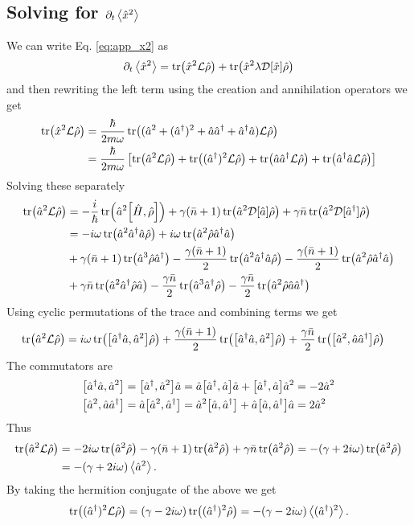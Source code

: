 \subsection{Solving for $\partial_t\expval{\hat{x}^2}$}
We can write Eq. \eqref{eq:app_x2} as 
\begin{equation}
    \partial_t\expval{\hat{x}^2} = \tr(\hat{x}^2 \mathcal{L}\hat{\rho}) + \tr(\hat{x}^2 \lambda \mathcal{D}[\hat{x}] \hat{\rho})\label{eq:app_x2b}
\end{equation}
and then rewriting the left term using the creation and annihilation operators we get
\begin{align}
    \tr(\hat{x}^2 \mathcal{L}\hat{\rho}) &= \frac{\hbar}{2m \omega} \tr((\hat{a}^2 + (\hat{a}^{\dagger})^2 + \hat{a}\hat{a}^{\dagger} + \hat{a}^{\dagger}\hat{a}) \mathcal{L}\hat{\rho} )\\ 
    &= \frac{\hbar}{2 m \omega} \left[ \tr(\hat{a}^2 \mathcal{L}\hat{\rho}) + \tr((\hat{a}^{\dagger})^2 \mathcal{L}\hat{\rho}) + \tr(\hat{a}\hat{a}^{\dagger} \mathcal{L}\hat{\rho}) + \tr(\hat{a}^{\dagger}\hat{a} \mathcal{L}\hat{\rho})\right]
\end{align}
Solving these separately
\begin{align}
    \tr(\a^2 \mathcal{L} \dmatrix) &= -\frac{i}{\hbar}\tr(\a^2\comm{\hamiltonian}{\dmatrix}) + \gamma(\nbar + 1)\tr(\a^2 \mathcal{D}[\a]\dmatrix) + \gamma \nbar \tr(\a^2 \mathcal{D}[\ad]\dmatrix)\\
    &= -i\omega \tr(\a^2 \ad\a \dmatrix) + i \omega \tr(\a^2\dmatrix \ad\a)\\ 
    &+ \gamma(\nbar + 1) \tr(\a^3 \dmatrix \ad)- \frac{\gamma(\nbar + 1)}{2} \tr(\a^2\ad\a \dmatrix) - \frac{\gamma(\nbar + 1)}{2} \tr(\a^2 \dmatrix \ad\a)\\
    &+ \gamma \nbar \tr(\a^2\ad \dmatrix \a) - \frac{\gamma \nbar}{2} \tr(\a^3 \ad \dmatrix) - \frac{\gamma \nbar}{2} \tr(\a^2 \dmatrix \a\ad)
\end{align}
Using cyclic permutations of the trace and combining terms we get
\begin{align}
    \tr(\a^2 \mathcal{L} \dmatrix) &=  i\omega \tr(\comm{\ad\a}{\a^2}\dmatrix) + \frac{\gamma (\nbar + 1)}{2} \tr(\comm{\ad\a}{\a^2}\dmatrix) + \frac{\gamma \nbar}{2}\tr(\comm{\a^2}{\a\ad}\dmatrix)
\end{align}
The commutators are
\begin{align}
    \comm{\ad\a}{\a^2} &= \comm{\ad}{\a^2}\a = \a\comm{\ad}{\a}\a + \comm{\ad}{\a}\a^2 = -2 \a^2 \\
    \comm{\a^2}{\a\ad} &= \a\comm{\a^2}{\ad} = \a^2 \comm{\a}{\ad}+ \a\comm{\a}{\ad}\a = 2\a^2
\end{align}
Thus
\begin{align}
    \tr(\hat{a}^2 \mathcal{L} \hat{\rho}) &=  -2i\omega \tr(\hat{a}^2 \hat{\rho}) - \gamma(\bar{n} + 1) \tr(\hat{a}^2 \hat{\rho}) + \gamma \bar{n} \tr(\hat{a}^2 \hat{\rho}) = -(\gamma + 2i\omega) \tr(\hat{a}^2 \hat{\rho})\\
    &= -(\gamma + 2i\omega) \expval{\hat{a}^2}.
\end{align}
By taking the hermition conjugate of the above we get
\begin{equation}
    \tr((\hat{a}^{\dagger})^2 \mathcal{L} \hat{\rho}) = (\gamma - 2i\omega) \tr((\hat{a}^{\dagger})^2 \hat{\rho}) = -(\gamma - 2i\omega) \expval{(\hat{a}^{\dagger})^2}.
\end{equation}

